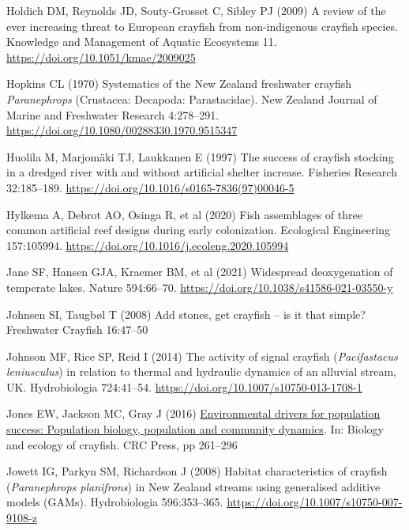 \documentclass[
  12pt,
  a4paper,
  oneside]{scrbook}
\newlength{\cslhangindent}
\newenvironment{CSLReferences}[2] %
 {\begin{list}{}{%
  \setlength{\itemindent}{0pt}
  \setlength{\leftmargin}{0pt}
  \setlength{\parsep}{0pt}
  \ifodd #1
   \setlength{\leftmargin}{\cslhangindent}
   \setlength{\itemindent}{-1\cslhangindent}
  \fi
  \setlength{\itemsep}{#2\baselineskip}}}
 {\end{list}}
\begin{document}
\begin{CSLReferences}{1}{1}
Holdich DM, Reynolds JD, Souty-Grosset C, Sibley PJ (2009) A review of
the ever increasing threat to {European} crayfish from non-indigenous
crayfish species. Knowledge and Management of Aquatic Ecosystems 11.
\url{https://doi.org/10.1051/kmae/2009025}

Hopkins CL (1970) Systematics of the {New Zealand} freshwater crayfish
{\emph{Paranephrops}} ({Crustacea}: {Decapoda}: {Parastacidae}). New
Zealand Journal of Marine and Freshwater Research 4:278--291.
\url{https://doi.org/10.1080/00288330.1970.9515347}

Huolila M, Marjomäki TJ, Laukkanen E (1997) The success of crayfish
stocking in a dredged river with and without artificial shelter
increase. Fisheries Research 32:185--189.
\url{https://doi.org/10.1016/s0165-7836(97)00046-5}

Hylkema A, Debrot AO, Osinga R, et al (2020) Fish assemblages of three
common artificial reef designs during early colonization. Ecological
Engineering 157:105994.
\url{https://doi.org/10.1016/j.ecoleng.2020.105994}

{Jane SF, Hansen GJA, Kraemer BM, et al} (2021) Widespread deoxygenation
of temperate lakes. Nature 594:66--70.
\url{https://doi.org/10.1038/s41586-021-03550-y}

Johnsen SI, Taugbøl T (2008) Add stones, get crayfish -- is it that
simple? Freshwater Crayfish 16:47--50

Johnson MF, Rice SP, Reid I (2014) The activity of signal crayfish
({\emph{Pacifastacus leniusculus}}) in relation to thermal and hydraulic
dynamics of an alluvial stream, {UK}. Hydrobiologia 724:41--54.
\url{https://doi.org/10.1007/s10750-013-1708-1}

Jones EW, Jackson MC, Gray J (2016)
\href{https://doi.org/10.1201/b20073-10}{Environmental drivers for
population success: Population biology, population and community
dynamics}. In: Biology and ecology of crayfish. CRC Press, pp 261--296

Jowett IG, Parkyn SM, Richardson J (2008) Habitat characteristics of
crayfish ({\emph{Paranephrops planifrons}}) in {New Zealand} streams
using generalised additive models ({GAMs}). Hydrobiologia 596:353--365.
\url{https://doi.org/10.1007/s10750-007-9108-z}


\end{CSLReferences}
\end{document}
